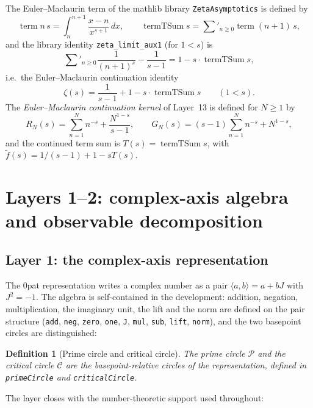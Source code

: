 \documentclass{article}
\newtheorem{definition}[theorem]{Definition}
\newcommand{\zt}{\zeta}
\newcommand{\tsum}{\textstyle\sum'}
\begin{document}
The Euler--Maclaurin term of the mathlib library \texttt{ZetaAsymptotics} is
defined by
\[
\operatorname{term} n\,s=\int_n^{n+1}\frac{x-n}{x^{s+1}}\,dx,\qquad
\operatorname{termTSum} s=\tsum_{n\ge 0}\operatorname{term}(n+1)\,s,
\]
and the library identity \texttt{zeta\_limit\_aux1} (for $1<s$) is
\[
\tsum_{n\ge 0}\frac{1}{(n+1)^s}-\frac{1}{s-1}=1-s\cdot\operatorname{termTSum} s,
\]
i.e.\ the Euler--Maclaurin continuation identity
\begin{equation}
\label{eq:em}
\zt(s)=\frac{1}{s-1}+1-s\cdot\operatorname{termTSum} s\qquad(1<s).
\end{equation}
The \emph{Euler--Maclaurin continuation kernel} of Layer~13 is defined for
$N\ge 1$ by
\begin{equation}
\label{eq:kernel}
R_N(s)=\sum_{n=1}^{N}n^{-s}+\frac{N^{1-s}}{s-1},\qquad
G_N(s)=(s-1)\sum_{n=1}^{N}n^{-s}+N^{1-s},
\end{equation}
and the continued term sum is $T(s)=\operatorname{termTSum} s$, with
$\tilde f(s)=1/(s-1)+1-sT(s)$.

\section{Layers 1--2: complex-axis algebra and observable decomposition}
\label{sec:L1}

\subsection{Layer 1: the complex-axis representation}
\label{sec:L1a}

The 0pat representation writes a complex number as a pair
$\langle a,b\rangle=a+bJ$ with $J^2=-1$. The algebra is self-contained in
the development: addition, negation, multiplication, the imaginary unit, the
lift and the norm are defined on the pair structure
(\texttt{add}, \texttt{neg}, \texttt{zero}, \texttt{one}, \texttt{J},
\texttt{mul}, \texttt{sub}, \texttt{lift}, \texttt{norm}), and the two
basepoint circles are distinguished:

\begin{definition}[Prime circle and critical circle]
The \emph{prime circle} $\mathcal{P}$ and the \emph{critical circle}
$\mathcal{C}$ are the basepoint-relative circles of the representation,
defined in \texttt{primeCircle} and \texttt{criticalCircle}.
\end{definition}

The layer closes with the number-theoretic support used throughout:
\end{document}
